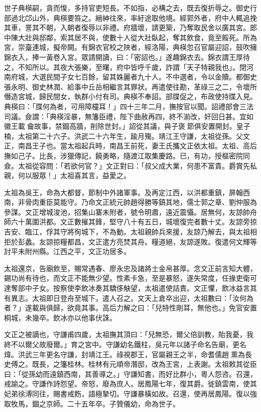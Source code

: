 世子典楧嗣，貪而愎，多持官吏短長。不如指，必構之去，既去復折辱之。御史行部過北邙山外，典楧要笞之。縉紳往來，率紆途取他境。經郭外者，府中人輒追挽其車，詈其不朝，入朝者復辱以非禮。府牆壞，請更築，乃奪取民舍以廣其宮。郎中陳大壯與邸鄰，索其居不與，使數十人從大壯臥起，奪其飲食，竟至餒死。所為宮，崇臺連城，擬帝闕。有錦衣官校之陜者，經洛陽，典楧忽召官屬迎詔，鼓吹擁錦衣入，捧一黃卷入宮。眾請開讀，曰：「密詔也。」遂趣錦衣去。錦衣謂王厚待之，不知所以。其夜大張樂，至曙，府中皆呼千歲，詐謂「天子特親我也」。閉河南府城，大選民間子女七百餘，留其姝麗者九十人。不中選者，令以金贖。都御史張永明、御史林潤、給事中丘岳相繼言其罪狀。再遣使往勘，革祿三之二，令壞所僭造宮城，歸民間女，執群小付有司。典楧不奉詔。部牒促之，布政使持牒入見。典楧曰：「牒何為者，可用障欞耳！」四十三年二月，撫按官以聞。詔禮部會三法司議。僉謂：「典楧淫暴，無籓臣禮，陛下曲赦再四，終不湔改，奸回日甚。宜如徽王載龠故事，禁錮高牆，削除世封。」詔從其議，與子褒節俱安置開封。皇子楠，太祖第二十六子。洪武二十六年生，踰月殤。靖江王守謙，太祖從孫。父文正，南昌王子也。當太祖起兵時，南昌王前死，妻王氏攜文正依太祖。太祖、高后撫如己子。比長，涉獵傳記，饒勇略，隨渡江取集慶路。已，有功，授樞密院同僉。太祖從容問：「若欲何官？」文正對曰：「叔父成大業，何患不富貴。爵賞先私親，何以服眾！」太祖喜其言，益愛之。

太祖為吳王，命為大都督，節制中外諸軍事。及再定江西，以洪都重鎮，屏翰西南，非骨肉重臣莫能守。乃命文正統元帥趙得勝等鎮其地，儒士郭之章、劉仲服為參謀。文正增城浚池，招集山寨未附者，號令明肅，遠近震懾。居無何，友諒帥舟師六十萬圍洪都。文正數摧其鋒，堅守八十有五日，城壞復完者數十丈。友諒旁掠吉安、臨江，俘其守將徇城下，不為動。太祖親帥兵來援，友諒乃解去，與太祖相拒於彭蠡。友諒掠糧都昌，文正遣方亮焚其舟。糧道絕，友諒遂敗。復遣何文輝等討平未附州縣。江西之平，文正功居多。

太祖還京，告廟飲至，賜常遇春、廖永忠及諸將士金帛甚厚。念文正前言知大體，錫功尚有待也，而文正不能無少望。性素卡急，至是暴怒，遂失常度，任掾吏衛可達奪部中子女。按察使李飲冰奏其驕侈觖望，太祖遣使詰責。文正懼，飲冰益言其有異志。太祖即日登舟至城下，遣人召之。文天上倉卒出迎，太祖數曰：「汝何為者？」遂載與俱歸，欲竟其事。高后力解之曰：「兒特性剛耳，無他也。」免官安置桐城，未幾卒。飲冰亦以他事伏誅。

文正之被謫也，守謙甫四歲，太祖撫其頂曰：「兒無恐，爾父倍訓教，貽我憂，我終不以爾父故廢爾。」育之宮中。守謙幼名鐵柱，吳元年以諸子命名告廟，更名煒。洪武三年更名守謙，封靖江王。祿視郡王，官屬親王之半，命耆儒趙熏為長史傅之。既長，之籓桂林。桂林有元順帝潛邸，改為王宮，上表謝。太祖敕其從臣曰：「從孫幼而遠鎮西南，其善導之。」守謙知書，而好比群小，粵人怨咨。召還，戒諭之。守謙作詩怨望。帝怒，廢為庶人。居鳳陽七年，復其爵。徙鎮雲南，使其妃弟徐溥同往，賜書戒飭，語極摯切。守謙暴橫如故。召還，使再居鳳陽。復以強取牧馬，錮之京師。二十五年卒。子贊儀幼，命為世子。

